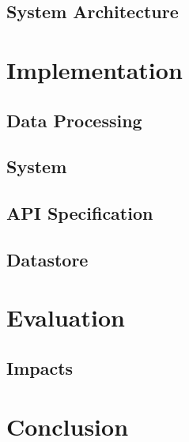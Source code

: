 \documentclass[12pt, a4paper]{report}
\begin{document}
\section{System Architecture}


\newpage
\chapter{Implementation}
\section{Data Processing}

\section{System}

\section{API Specification}

\section{Datastore}


\newpage
\chapter{Evaluation}


\newpage
\section{Impacts}


\newpage
\chapter{Conclusion}





\end{document}
